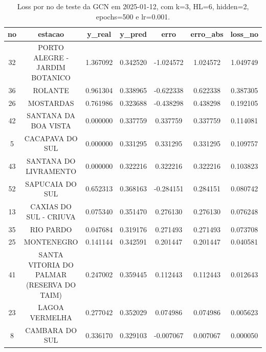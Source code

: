 \begin{table}[h]
\centering
\caption{Loss por no de teste da GCN em 2025-01-12, com k=3, HL=6, hidden=2, epochs=500 e lr=0.001.}
\label{tab:gcn_loss_k3_hl6_h2_e500_d20250112}
\begin{tabular}{ccccccc}
\toprule
no & estacao & y\_real & y\_pred & erro & erro\_abs & loss\_no \\
\midrule
32 & PORTO ALEGRE - JARDIM BOTANICO & 1.367092 & 0.342520 & -1.024572 & 1.024572 & 1.049749 \\
36 & ROLANTE & 0.961304 & 0.338965 & -0.622338 & 0.622338 & 0.387305 \\
26 & MOSTARDAS & 0.761986 & 0.323688 & -0.438298 & 0.438298 & 0.192105 \\
42 & SANTANA DA BOA VISTA & 0.000000 & 0.337759 & 0.337759 & 0.337759 & 0.114081 \\
5 & CACAPAVA DO SUL & 0.000000 & 0.331295 & 0.331295 & 0.331295 & 0.109757 \\
43 & SANTANA DO LIVRAMENTO & 0.000000 & 0.322216 & 0.322216 & 0.322216 & 0.103823 \\
52 & SAPUCAIA DO SUL & 0.652313 & 0.368163 & -0.284151 & 0.284151 & 0.080742 \\
13 & CAXIAS DO SUL - CRIUVA & 0.075340 & 0.351470 & 0.276130 & 0.276130 & 0.076248 \\
35 & RIO PARDO & 0.047684 & 0.319176 & 0.271493 & 0.271493 & 0.073708 \\
25 & MONTENEGRO & 0.141144 & 0.342591 & 0.201447 & 0.201447 & 0.040581 \\
41 & SANTA VITORIA DO PALMAR (RESERVA DO TAIM) & 0.247002 & 0.359445 & 0.112443 & 0.112443 & 0.012643 \\
23 & LAGOA VERMELHA & 0.277042 & 0.352029 & 0.074986 & 0.074986 & 0.005623 \\
8 & CAMBARA DO SUL & 0.336170 & 0.329103 & -0.007067 & 0.007067 & 0.000050 \\
\bottomrule
\end{tabular}
\end{table}
